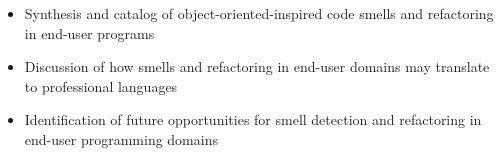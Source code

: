 \documentclass[10pt,conference,compsocconf]{IEEEtran}
\begin{document}
\begin{itemize}
	\item Synthesis and catalog of object-oriented-inspired code smells  and refactoring in end-user programs
	\item Discussion of how smells and refactoring in  end-user domains may translate to professional languages
	\item Identification of future opportunities for smell detection and refactoring in end-user programming domains
\end{itemize}

\balance





\end{document}
